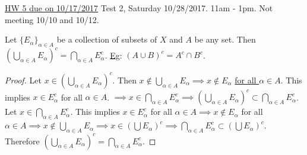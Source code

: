 \documentclass[]{article}
\begin{document}
\ul{HW 5 due on 10/17/2017} Test 2, Saturday 10/28/2017. 11am - 1pm. Not meeting 10/10 and 10/12.

\begin{theorem}
	Let $\{E_\alpha\}_{\alpha\in A}$ be a collection of subsets of $X$ and $A$ be any set.
	Then $\left( \bigcup_{\alpha\in A} E_\alpha\right)^c = \bigcap_{\alpha\in A} E_\alpha^c$. \ul{Eg}: $(A\cup B)^c = A^c\cap B^c$.
\end{theorem}
\begin{proof}
	\say{$\subset$} Let $x\in\left(\bigcup_{\alpha\in A} E_\alpha\right)^c$. Then $x\notin \bigcup_{\alpha\in A} E_\alpha \implies x \notin E_\alpha$  \ul{for all $\alpha\in A$}.
	This implies $x\in E_\alpha^c$ for all $\alpha\in A$. $\implies x\in \bigcap_{\alpha\in A} E_\alpha^c \implies \left(\bigcup_{\alpha\in A} E_\alpha\right)^c \subset \bigcap_{\alpha\in A} E_\alpha^c$.
	\say{$\supset$} Let $x\in \bigcap_{\alpha\in A} E_\alpha^c$. This implies $x\in E_\alpha^c$ for all $\alpha \in A \implies x\notin E_\alpha$ for all $\alpha \in A \implies x\notin \bigcup_{\alpha\in A} E_\alpha \implies x\in\left( \bigcup E_\alpha \right)^c \implies \bigcap_{\alpha\in A} E_\alpha^c \subset(\bigcup E_\alpha )^c$.
	Therefore  $\left(\bigcup_{\alpha\in A}E_\alpha\right)^c = \bigcap_{\alpha\in A} E_\alpha^c$.
\end{proof}
\end{document}
